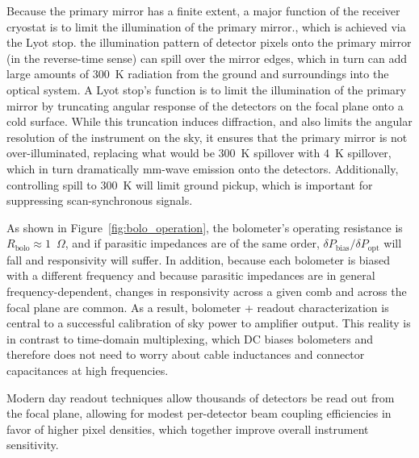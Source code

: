 Because the primary mirror has a finite extent, a major function of the receiver cryostat is to limit the illumination of the primary mirror., which is achieved via the Lyot stop. the illumination pattern of detector pixels onto the primary mirror (in the reverse-time sense) can spill over the mirror edges, which in turn can add large amounts of 300~K radiation from the ground and surroundings into the optical system. A Lyot stop's function is to limit the illumination of the primary mirror by truncating angular response of the detectors on the focal plane onto a cold surface. While this truncation induces diffraction, and also limits the angular resolution of the instrument on the sky, it ensures that the primary mirror is not over-illuminated, replacing what would be 300~K spillover with 4~K spillover, which in turn dramatically mm-wave emission onto the detectors. Additionally, controlling spill to 300~K will limit ground pickup, which is important for suppressing scan-synchronous signals.

As shown in Figure~\ref{fig:bolo_operation}, the bolometer's operating resistance is $R_{\mathrm{bolo}} \approx 1$~$\Omega$, and if parasitic impedances are of the same order, $\delta P_{\mathrm{bias}} / \delta P_{\mathrm{opt}}$ will fall and responsivity will suffer. In addition, because each bolometer is biased with a different frequency and because parasitic impedances are in general frequency-dependent, changes in responsivity across a given comb and across the focal plane are common. As a result, bolometer + readout characterization is central to a successful calibration of sky power to amplifier output. This reality is in contrast to time-domain multiplexing, which DC biases bolometers and therefore does not need to worry about cable inductances and connector capacitances at high frequencies.

Modern day readout techniques allow thousands of detectors be read out from the focal plane, allowing for modest per-detector beam coupling efficiencies in favor of higher pixel densities, which together improve overall instrument sensitivity.